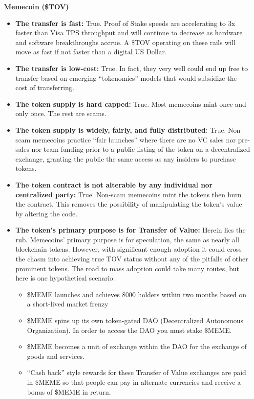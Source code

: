 \documentclass{article}
\begin{document}
\textbf{Memecoin (\$TOV)}

\begin{itemize}
\item \textbf{The transfer is fast:} True. Proof of Stake speeds are accelerating to 3x faster than Visa TPS throughput and will continue to decrease as hardware and software breakthroughs accrue. A \$TOV operating on these rails will move as fast if not faster than a digital US Dollar.
\item \textbf{The transfer is low-cost:} True. In fact, they very well could end up free to transfer based on emerging ``tokenomics'' models that would subsidize the cost of transferring.
\item \textbf{The token supply is hard capped:} True. Most memecoins mint once and only once. The rest are scams.
\item \textbf{The token supply is widely, fairly, and fully distributed:} True. Non-scam memecoins practice ``fair launches'' where there are no VC sales nor pre-sales nor team funding prior to a public listing of the token on a decentralized exchange, granting the public the same access as any insiders to purchase tokens.
\item \textbf{The token contract is not alterable by any individual nor centralized party:} True. Non-scam memecoins mint the tokens then burn the contract. This removes the possibility of manipulating the token's value by altering the code.
\item \textbf{The token's primary purpose is for Transfer of Value:} Herein lies the rub. Memecoins' primary purpose is for speculation, the same as nearly all blockchain tokens. However, with significant enough adoption it could cross the chasm into achieving true TOV status without any of the pitfalls of other prominent tokens. The road to mass adoption could take many routes, but here is one hypothetical scenario:
\begin{itemize}
\item \$MEME launches and achieves 8000 holders within two months based on a short-lived market frenzy
\item \$MEME spins up its own token-gated DAO (Decentralized Autonomous Organization). In order to access the DAO you must stake \$MEME.
\item \$MEME becomes a unit of exchange within the DAO for the exchange of goods and services.
\item ``Cash back'' style rewards for these Transfer of Value exchanges are paid in \$MEME so that people can pay in alternate currencies and receive a bonus of \$MEME in return.

\end{itemize}
\end{itemize}
\end{document}
